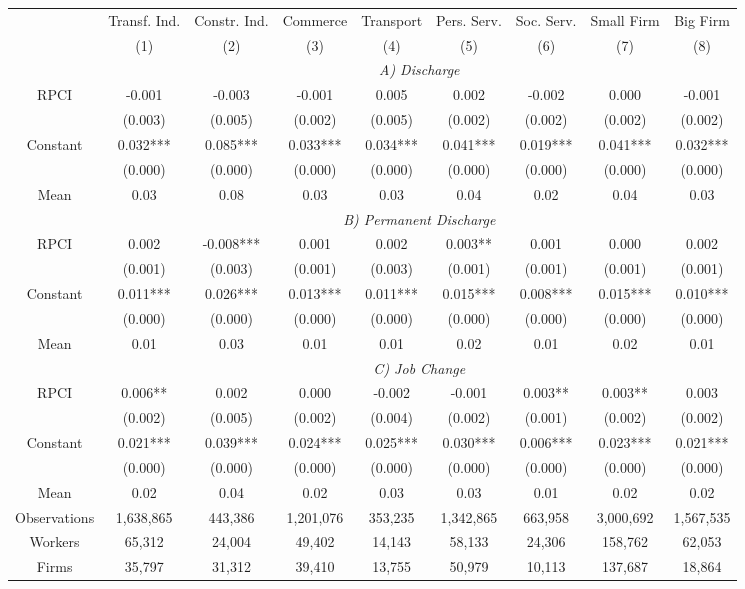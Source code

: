 \begin{tabular}{ccccccccc}
\toprule
\toprule
      & Transf. Ind. & Constr. Ind. & Commerce & Transport & Pers. Serv. & Soc. Serv. & Small Firm & Big Firm \\
      & (1)   & (2)   & (3)   & (4)   & (5)   & (6)   & (7)   & (8) \\
\cmidrule{2-9}      & \multicolumn{8}{c}{\textit{A) Discharge}} \\
\midrule
RPCI  & -0.001 & -0.003 & -0.001 & 0.005 & 0.002 & -0.002 & 0.000 & -0.001 \\
      & (0.003) & (0.005) & (0.002) & (0.005) & (0.002) & (0.002) & (0.002) & (0.002) \\
Constant & 0.032*** & 0.085*** & 0.033*** & 0.034*** & 0.041*** & 0.019*** & 0.041*** & 0.032*** \\
      & (0.000) & (0.000) & (0.000) & (0.000) & (0.000) & (0.000) & (0.000) & (0.000) \\
Mean  & 0.03  & 0.08  & 0.03  & 0.03  & 0.04  & 0.02  & 0.04  & 0.03 \\
\cmidrule{2-9}      & \multicolumn{8}{c}{\textit{B) Permanent Discharge}} \\
RPCI  & 0.002 & -0.008*** & 0.001 & 0.002 & 0.003** & 0.001 & 0.000 & 0.002 \\
      & (0.001) & (0.003) & (0.001) & (0.003) & (0.001) & (0.001) & (0.001) & (0.001) \\
Constant & 0.011*** & 0.026*** & 0.013*** & 0.011*** & 0.015*** & 0.008*** & 0.015*** & 0.010*** \\
      & (0.000) & (0.000) & (0.000) & (0.000) & (0.000) & (0.000) & (0.000) & (0.000) \\
Mean  & 0.01  & 0.03  & 0.01  & 0.01  & 0.02  & 0.01  & 0.02  & 0.01 \\
\cmidrule{2-9}      & \multicolumn{8}{c}{\textit{C) Job Change}} \\
\midrule
RPCI  & 0.006** & 0.002 & 0.000 & -0.002 & -0.001 & 0.003** & 0.003** & 0.003 \\
      & (0.002) & (0.005) & (0.002) & (0.004) & (0.002) & (0.001) & (0.002) & (0.002) \\
Constant & 0.021*** & 0.039*** & 0.024*** & 0.025*** & 0.030*** & 0.006*** & 0.023*** & 0.021*** \\
      & (0.000) & (0.000) & (0.000) & (0.000) & (0.000) & (0.000) & (0.000) & (0.000) \\
Mean  & 0.02  & 0.04  & 0.02  & 0.03  & 0.03  & 0.01  & 0.02  & 0.02 \\
\midrule
Observations & 1,638,865 & 443,386 & 1,201,076 & 353,235 & 1,342,865 & 663,958 & 3,000,692 & 1,567,535 \\
Workers & 65,312 & 24,004 & 49,402 & 14,143 & 58,133 & 24,306 & 158,762 & 62,053 \\
Firms & 35,797 & 31,312 & 39,410 & 13,755 & 50,979 & 10,113 & 137,687 & 18,864 \\
\bottomrule
\bottomrule
\end{tabular}%
